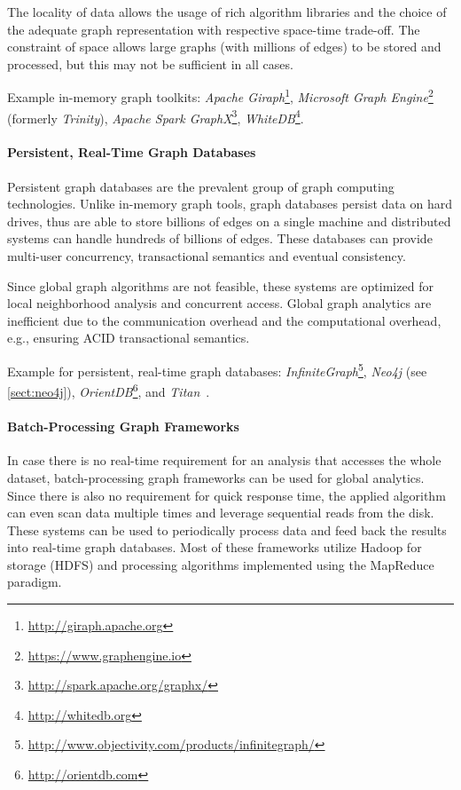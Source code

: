 The locality of data allows the usage of rich algorithm libraries and the choice of the adequate graph representation with respective space-time trade-off. The constraint of space allows large graphs (with millions of edges) to be stored and processed, but this may not be sufficient in all cases.

Example in-memory graph toolkits: \emph{Apache Giraph}\footnote{\small\url{http://giraph.apache.org}}, \emph{Microsoft Graph Engine}\footnote{\small\url{https://www.graphengine.io}} (formerly \emph{Trinity}), \emph{Apache Spark GraphX}\footnote{\small\url{http://spark.apache.org/graphx/}}, \emph{WhiteDB}\footnote{\small\url{http://whitedb.org}}.

\paragraph{Persistent, Real-Time Graph Databases}
Persistent graph databases are the prevalent group of graph computing technologies. Unlike in-memory graph tools, graph databases persist data on hard drives, thus are able to store billions of edges on a single machine and distributed systems can handle hundreds of billions of edges. These databases can provide multi-user concurrency, transactional semantics and eventual consistency.

Since global graph algorithms are not feasible, these systems are optimized for local neighborhood analysis and concurrent access. Global graph analytics are inefficient due to the communication overhead and the computational overhead, e.g., ensuring ACID transactional semantics.

Example for persistent, real-time graph databases: \emph{InfiniteGraph}\footnote{\small\url{http://www.objectivity.com/products/infinitegraph/}}, \emph{Neo4j} (see \cref{sect:neo4j}), \emph{OrientDB}\footnote{\small\url{http://orientdb.com}}, and \emph{Titan}~\cite{titan}.

\paragraph{Batch-Processing Graph Frameworks}
In case there is no real-time requirement for an analysis that accesses the whole dataset, batch-processing graph frameworks can be used for global analytics. Since there is also no requirement for quick response time, the applied algorithm can even scan data multiple times and leverage sequential reads from the disk. These systems can be used to periodically process data and feed back the results into real-time graph databases. Most of these frameworks utilize Hadoop for storage (HDFS) and processing algorithms implemented using the MapReduce paradigm.

